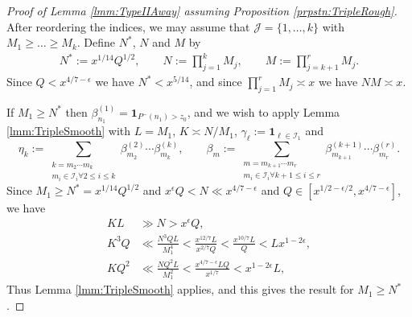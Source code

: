 \documentclass[10pt]{amsart}
\theoremstyle{plain}
\numberwithin{equation}{section}
\begin{document}
\begin{proof}[Proof of Lemma \ref{lmm:TypeIIAway} assuming Proposition \ref{prpstn:TripleRough}]
After reordering the indices, we may assume that $\mathcal{J}=\{1,\dots,k\}$ with $M_1\ge \dots \ge M_k$. Define $N^*$, $N$ and $M$ by
\begin{align*}
N^*:=x^{1/14}Q^{1/2},\qquad
N:=\prod_{j=1}^k M_j,\qquad 
M:=\prod_{j=k+1}^r M_j.
\end{align*}
Since $Q<x^{4/7-\epsilon}$ we have $N^*<x^{5/14}$, and since $\prod_{j=1}^r M_j\asymp x$ we have $N M\asymp x$.

If $M_1\ge N^*$ then $\beta^{(1)}_{n_1}=\mathbf{1}_{P^-(n_1)>z_0}$, and we wish to apply Lemma \ref{lmm:TripleSmooth} with $L=M_1$, $K\asymp N/M_1$, $\gamma_\ell:=\mathbf{1}_{\ell\in \mathcal{I}_1}$ and
\[
\eta_k:=\sum_{\substack{k=m_2\cdots m_{k}\\ m_i\in\mathcal{I}_i\forall 2\le i\le k}}\beta^{(2)}_{m_2}\cdots \beta^{(k)}_{m_{k}},\qquad \beta_m:=\sum_{\substack{m=m_{k+1}\cdots m_r\\ m_i\in \mathcal{I}_i\forall k+1\le i\le r}}\beta^{(k+1)}_{m_{k+1}}\cdots \beta^{(r)}_{m_r}.
\]
Since $M_1\ge N^*=x^{1/14}Q^{1/2}$ and $x^\epsilon Q< N\ll x^{4/7-\epsilon}$ and $Q\in [x^{1/2-\epsilon/2},x^{4/7-\epsilon}]$, we have
\begin{align*}
KL&\gg N> x^\epsilon Q,\\
K^3Q&\ll\frac{N^3Q L}{M_1^4}<\frac{x^{12/7} L}{x^{2/7}Q}<\frac{x^{10/7} L}{Q}<L x^{1-2\epsilon},\\
KQ^2&\ll \frac{N Q^2 L}{M_1^2}<\frac{x^{4/7-\epsilon} L Q}{x^{1/7}}<x^{1-2\epsilon}L,
\end{align*}
Thus Lemma \ref{lmm:TripleSmooth} applies, and this gives the result for $M_1 \ge N^*$.


\end{proof}
\end{document}
